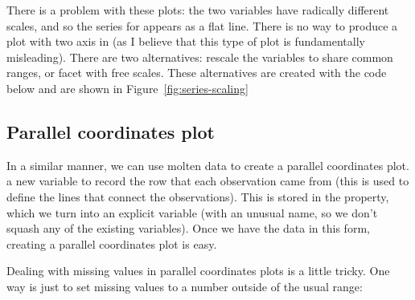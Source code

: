 There is a problem with these plots: the two variables have radically different scales, and so the series for  appears as a flat line.  There is no way to produce a plot with two axis in \ggplot (as I believe that this type of plot is fundamentally misleading).  There are two alternatives: rescale the variables to share common ranges, or facet with free scales.  These alternatives are created with the code below and are shown in Figure~\ref{fig:series-scaling}

% 


\subsection{Parallel coordinates plot} 
\label{sub:molten_data}

In a similar manner, we can use molten data to create a parallel coordinates plot.   a new variable to record the row that each observation came from (this is used to define the lines that connect the observations).  This is stored in the  property, which we turn into an explicit variable (with an unusual name, so we don't squash any of the existing variables).  Once we have the data in this form, creating a parallel coordinates plot is easy.

% 
% 
% 


Dealing with missing values in parallel coordinates plots is a little tricky.  One way is just to set missing values to a number outside of the usual range:

